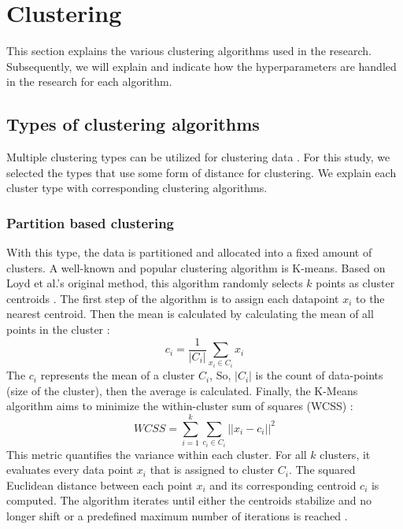 \section{Clustering}
This section explains the various clustering algorithms used in the research.
Subsequently, we will explain and indicate how the hyperparameters are handled in the research for each algorithm.
\subsection{Types of clustering algorithms}
Multiple clustering types can be utilized for clustering data \citep{xu_comprehensive_2015}.
For this study, we selected the types that use some form of distance for clustering.
We explain each cluster type with corresponding clustering algorithms.
\subsubsection{Partition based clustering}
With this type, the data is partitioned and allocated into a fixed amount of clusters.
A well-known and popular clustering algorithm is K-means.
Based on Loyd et al.'s original method, this algorithm randomly selects $k$ points as cluster centroids \citep{1056489}.
The first step of the algorithm is to assign each datapoint $x_i$ to the nearest centroid.
Then the mean is calculated by calculating the mean of all points in the cluster \citep{yuan_research_2019}:
\begin{equation}
  c_i = \frac{1}{|C_i|} \sum_{x_i \in C_i} x_i
\end{equation}
The $c_i$ represents the mean of a cluster $C_i$,
So, $|C_i|$ is the count of data-points (size of the cluster), then the average is calculated.
Finally, the K-Means algorithm aims to minimize the within-cluster sum of squares (WCSS) \citep{yuan_research_2019}:
\begin{equation}
  WCSS = \sum_{i=1}^{k} \sum_{c_i \in C_i} || x_i - c_i ||^2
\end{equation}
This metric quantifies the variance within each cluster. For all \( k \) clusters, it evaluates every data point \( x_i \) that is assigned to cluster \( C_i \).
The squared Euclidean distance between each point \( x_i \) and its corresponding centroid \( c_i \) is computed.
The algorithm iterates until either the centroids stabilize and no longer shift or a predefined maximum number of iterations is reached \citep{yuan_research_2019}.

